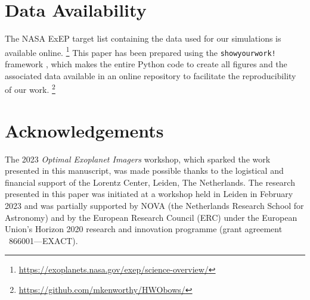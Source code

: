 \documentclass[usenatbib]{mnras}
\begin{document}

\vspace{-2mm}
\section*{Data Availability}

The NASA ExEP target list containing the data used for our simulations is  available online.%
\footnote{\url{https://exoplanets.nasa.gov/exep/science-overview/}}
%
This paper has been prepared using the \texttt{showyourwork!} framework \citep{Luger2021}, which makes the entire Python code to create all figures and the associated data available in an online repository to facilitate the reproducibility of our work.%
\footnote{\url{https://github.com/mkenworthy/HWObows/}}

\section*{Acknowledgements}

The 2023 \emph{Optimal Exoplanet Imagers} workshop, which sparked the work presented in this manuscript, was made possible thanks to the logistical and financial support of the Lorentz Center, Leiden, The Netherlands.
%
The research presented in this paper was initiated at a workshop held in Leiden in February 2023 and was partially supported by NOVA (the Netherlands Research School for Astronomy) and by the European Research Council (ERC) under the European Union's Horizon 2020 research and innovation programme (grant agreement \textnumero~866001---EXACT).
\end{document}
